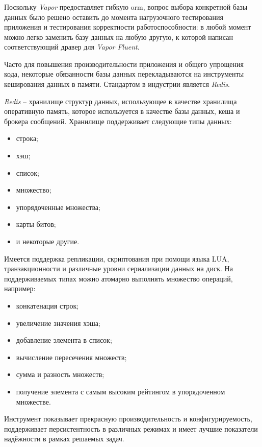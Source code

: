\subsubsection{}
\label{sec:development:arch:pp:redis}

Поскольку \textit{Vapor} предоставляет гибкую \gls{orm}, вопрос выбора конкретной базы данных было решено оставить до момента нагрузочного тестирования приложения и тестирования корректности работоспособности: в любой момент можно легко заменить базу данных на любую другую, к которой написан соответствующий дравер для \textit{Vapor Fluent}.

Часто для повышения производительности приложения и общего упрощения кода, некоторые обязанности базы данных перекладываются на инструменты кеширования данных в памяти. Стандартом в индустрии является \textit{Redis}.

\textit{Redis} -- хранилище структур данных, использующее в качестве хранилища оперативную память, которое используется в качестве базы данных, кеша и брокера сообщений. Хранилище поддерживает следующие типы данных:

\begin{itemize}
	\item строка;
	\item хэш;
	\item список;
	\item множество;
	\item упорядоченные множества;
	\item карты битов;
	\item и некоторые другие.
\end{itemize}

Имеется поддержка репликации, скриптования при помощи языка LUA, транзакционности и различные уровни сериализации данных на диск. На поддерживаемых типах можно атомарно выполнять множество операций, например:

\begin{itemize}
	\item конкатенация строк;
	\item увеличение значения хэша;
	\item добавление элемента в список;
	\item вычисление пересечения множеств;
	\item сумма и разность множеств;
	\item получение элемента с самым высоким рейтингом в упорядоченном множестве.
\end{itemize}

Инструмент показывает прекрасную производительность и конфигурируемость, поддерживает персистентность в различных режимах и имеет лучшие показатели надёжности в рамках решаемых задач.